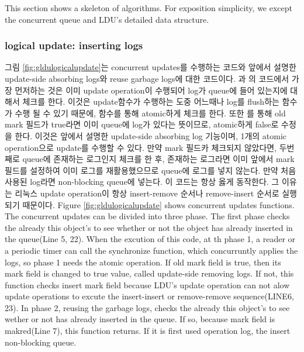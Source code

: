 \ifkor
\else
This section shows a skeleton of algorithms.
For exposition simplicity, we except the concurrent queue and LDU's detailed
data structure.
\fi


\subsubsection{logical update: inserting logs}
\ifkor
그림 \ref{fig:gldulogicalupdate}는 concurrent updates를 수행하는 코드와 앞에서 설명한 update-side
absorbing logs와 reuse garbage logs에 대한 코드이다. 
과 의 코드에서 가장 먼저하는 것은 이미 update
operation이 수행되어 log가 queue에 들어 있는지에 대해서 체크를 한다. 
이것은 update함수가 수행하는 도중 어느때나 log를 flush하는  함수가 수행 될 수 있기 때문에,
 함수를 통해 atomic하게 체크를 한다. 
또한 를 통해 old mark 필드가 true라면 이미 queue에 log가 있다는 뜻이므로, atomic하게 false로
수정을 한다.
이것은 앞에서 설명한 update-side absorbing log 기능이며, 1개의 atomic operation으로 update를 수행할 수
있다.
만약 mark 필드카 체크되지 않았다면, 두번째로 queue에 존재하는 로그인지 체크를 한 후, 존재하는 로그라면
이미 앞에서 mark필드를 설정하여 이미 로그를 재활용했으므로 queue에 로그를 넣지 않는다.
만약 처음 사용된 log라면 non-blocking queue에 넣는다.
이 코드는 항상 옳게 동작한다.  
그 이유는 리눅스 update operation이 항상 insert-remove 순서나 remove-insert 순서로 실행되기 때문이다.
\else
Figure \ref{fig:gldulogicalupdate} shows concurrent updates functions.
The concurrent updates can be divided into three phase.
The first phase checks the already this object's to see whether or not the
object has already inserted in the queue(Line 5, 22).
When the excution of this code, at th phase 1, a reader or a periodic timer can
call the synchronize function, which concurruntly applies the logs, so phase 1
needs the atomic operation.
If old mark field is true, then its mark field is changed to true value, called
update-side removing logs.
If not, this function checks insert mark field because LDU's update operation
can not alow update operations to excute the insert-insert or remove-remove
sequence(LINE6, 23).
In phase 2, reusing the garbage logs, checks the already this object's to see
wether or not has already inserted in the queue.
If so, because mark field is makred(Line 7), this function returns.
If it is first used operation log, the insert non-blocking queue.
\fi


